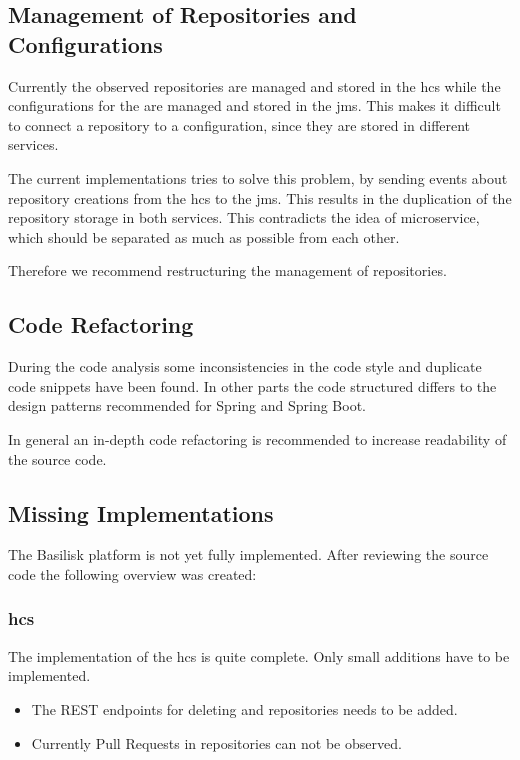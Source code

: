 
\subsection{Management of Repositories and Configurations}
\label{sec:management_repo_config}
Currently the observed repositories are managed and stored in the \ac{hcs} while the configurations for the \tsp{} are managed and stored in the \ac{jms}.
This makes it difficult to connect a repository to a \ts{} configuration, since they are stored in different services.

The current implementations tries to solve this problem, by sending events about repository creations from the \ac{hcs} to the \ac{jms}.
This results in the duplication of the repository storage in both services.
This contradicts the idea of microservice, which should be separated as much as possible from each other.

Therefore we recommend restructuring the management of repositories.


\subsection{Code Refactoring}
\label{sec:code_refactor}
During the code analysis some inconsistencies in the code style and duplicate code snippets have been found.
In other parts the code structured differs to the design patterns recommended for Spring and Spring Boot.

In general an in-depth code refactoring is recommended to increase readability of the source code. 


\subsection{Missing Implementations}
The Basilisk platform is not yet fully implemented.
After reviewing the source code the following overview was created:

\subsubsection{\acl{hcs}}
The implementation of the \acl{hcs} is quite complete.
Only small additions have to be implemented.

\begin{itemize}
	\item The REST endpoints for deleting \gh{} and \dockh{} repositories needs to be added.
	
	\item Currently Pull Requests in \gh{} repositories can not be observed.
\end{itemize}



